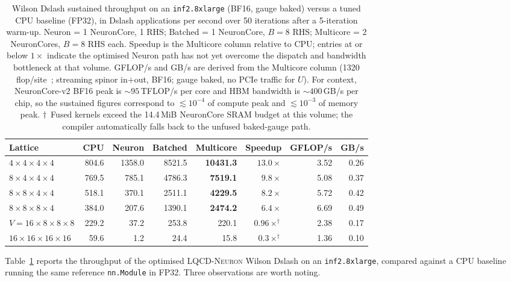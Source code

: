 \documentclass[a4paper,11pt]{article}
\begin{document}
\begin{table}[t]
\caption{Wilson Dslash sustained throughput on an \texttt{inf2.8xlarge}
(BF16, gauge baked) versus a tuned CPU baseline (FP32), in Dslash
applications per second over 50 iterations after a 5-iteration warm-up.
Neuron = 1 NeuronCore, 1 RHS; Batched = 1 NeuronCore, $B{=}8$ RHS;
Multicore = 2 NeuronCores, $B{=}8$ RHS each.  Speedup is the
Multicore column relative to CPU; entries at or below $1\times$ indicate
the optimised Neuron path has not yet overcome the dispatch and
bandwidth bottleneck at that volume.  GFLOP/s and GB/s are derived
from the Multicore column (1320 flop/site~\cite{Babich:2011np};
streaming spinor in${+}$out, BF16; gauge baked, no PCIe traffic for
$U$). For context, NeuronCore-v2 BF16 peak is
$\sim\!95$\,TFLOP/s per core and HBM bandwidth is
$\sim\!400$\,GB/s per chip, so the sustained figures correspond to
$\lesssim 10^{-4}$ of compute peak and $\lesssim 10^{-3}$ of memory peak.
$\dagger$~Fused kernels exceed the
14.4\,MiB NeuronCore SRAM budget at this volume; the compiler
automatically falls back to the unfused baked-gauge path.}
\label{tab:bench}
\centering
\footnotesize
\setlength{\tabcolsep}{4pt}
\begin{tabular}{lrrrrrr r}
\toprule
Lattice & CPU & Neuron & Batched & Multicore & Speedup & GFLOP/s & GB/s \\
\midrule
$4{\times}4{\times}4{\times}4$           &  804.6 & 1358.0 &  8521.5 & \textbf{10431.3} & $13.0\times$ & 3.52 & 0.26 \\
$8{\times}4{\times}4{\times}4$           &  769.5 &  785.1 &  4786.3 &  \textbf{7519.1} &  $9.8\times$ & 5.08 & 0.37 \\
$8{\times}8{\times}4{\times}4$           &  518.1 &  370.1 &  2511.1 &  \textbf{4229.5} &  $8.2\times$ & 5.72 & 0.42 \\
$8{\times}8{\times}8{\times}4$           &  384.0 &  207.6 &  1390.1 &  \textbf{2474.2} &  $6.4\times$ & 6.69 & 0.49 \\
$V=16{\times}8{\times}8{\times}8$          &  229.2 &   37.2 &   253.8 &            220.1 & $0.96\times^\dagger$ & 2.38 & 0.17 \\
$16{\times}16{\times}16{\times}16$       &   59.6 &    1.2 &    24.4 &             15.8 & $0.3\times^\dagger$ & 1.36 & 0.10 \\
\bottomrule
\end{tabular}
\end{table}

Table~\ref{tab:bench} reports the throughput of the optimised
\textsc{LQCD-Neuron} Wilson Dslash on an
\texttt{inf2.8xlarge},
compared against a CPU baseline running the same reference
\texttt{nn.Module} in FP32. Three observations are worth noting.
\end{document}

